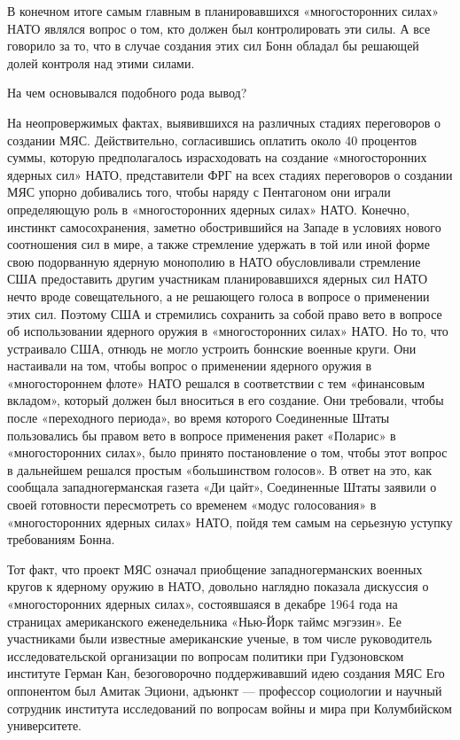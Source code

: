\documentclass[12pt, a4paper, openany]{book}
\begin{document}
	В конечном итоге самым главным в планировавшихся «многосторонних силах» НАТО являлся вопрос о том, кто должен был контролировать эти силы. А все говорило за то, что в случае создания этих сил Бонн обладал бы решающей долей контроля над этими силами.
	
	На чем основывался подобного рода вывод?
	
	На неопровержимых фактах, выявившихся на различных стадиях переговоров о создании МЯС. Действительно, согласившись оплатить около 40 процентов суммы, которую предполагалось израсходовать на создание «многосторонних ядерных сил» НАТО, представители ФРГ на всех стадиях переговоров о создании МЯС упорно добивались того, чтобы наряду с Пентагоном они играли определяющую роль в «многосторонних ядерных силах» НАТО. Конечно, инстинкт самосохранения, заметно обострившийся на Западе в условиях нового соотношения сил в мире, а также стремление удержать в той или иной форме свою подорванную ядерную монополию в НАТО обусловливали стремление США предоставить другим участникам планировавшихся ядерных сил НАТО нечто вроде совещательного, а не решающего голоса в вопросе о применении этих сил. Поэтому США и стремились сохранить за собой право вето в вопросе об использовании ядерного оружия в «многосторонних силах» НАТО. Но то, что устраивало США, отнюдь не могло устроить боннские военные круги. Они настаивали на том, чтобы вопрос о применении ядерного оружия в «многостороннем флоте» НАТО решался в соответствии с тем «финансовым вкладом», который должен был вноситься в его создание. Они требовали, чтобы после «переходного периода», во время которого Соединенные Штаты пользовались бы правом вето в вопросе применения ракет «Поларис» в «многосторонних силах», было принято постановление о том, чтобы этот вопрос в дальнейшем решался простым «большинством голосов». В ответ на это, как сообщала западногерманская газета «Ди цайт», Соединенные Штаты заявили о своей готовности пересмотреть со временем «модус голосования» в «многосторонних ядерных силах» НАТО, пойдя тем самым на серьезную уступку требованиям Бонна.
	
	Тот факт, что проект МЯС означал приобщение западногерманских военных кругов к ядерному оружию в НАТО, довольно наглядно показала дискуссия о «многосторонних ядерных силах», состоявшаяся в декабре 1964 года на страницах американского еженедельника «Нью-Йорк таймс мэгэзин». Ее участниками были известные американские ученые, в том числе руководитель исследовательской организации по вопросам политики при Гудзоновском институте Герман Кан, безоговорочно поддерживавший идею создания МЯС Его оппонентом был Амитак Эциони, адъюнкт — профессор социологии и научный сотрудник института исследований по вопросам войны и мира при Колумбийском университете.
	
\end{document}
